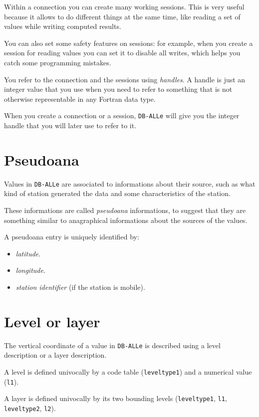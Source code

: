 \documentclass[final,12pt,a4paper,twoside]{book}
\newcommand{\dballe}{{\tt DB-ALLe}}
\begin{document}
Within a connection you can create many working sessions.  This is very useful
because it allows to do different things at the same time, like reading a set
of values while writing computed results.

You can also set some safety features on sessions: for example, when you create
a session for reading values you can set it to disable all writes, which helps
you catch some programming mistakes.

You refer to the connection and the sessions using \emph{handles}.  A handle is
just an integer value that you use when you need to refer to something that is
not otherwise representable in any Fortran data type.

When you create a connection or a session, \dballe{} will give you the integer
handle that you will later use to refer to it.

\section {Pseudoana}

Values in \dballe{} are associated to informations about their source, such as
what kind of station generated the data and some characteristics of the station.

These informations are called \emph{pseudoana} informations, to suggest that
they are something similar to anagraphical informations about the sources of
the values.

A pseudoana entry is uniquely identified by:

\begin{itemize}
\item \emph{latitude}.
\item \emph{longitude}.
\item \emph{station identifier} (if the station is mobile).
\end{itemize}

\section {Level or layer}

The vertical coordinate of a value in \dballe{} is described using a level
description or a layer description.

A level is defined univocally by a code table (\texttt{leveltype1}) and a
numerical value (\texttt{l1}).

A layer is defined univocally by its two bounding levels (\texttt{leveltype1},
\texttt{l1}, \texttt{leveltype2}, \texttt{l2}). 
\end{document}
